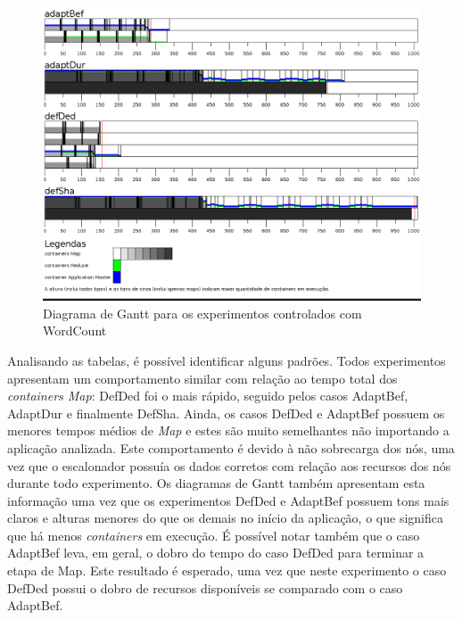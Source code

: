 \begin{figure}[!ht]
	\centering
	\includegraphics[width=\textwidth]{figuras/WC-simul.png}
	\caption{Diagrama de Gantt para os experimentos controlados com WordCount}
	\label{fig:exp1WC}
\end{figure}

Analisando as tabelas, é possível identificar alguns padrões. Todos experimentos apresentam um comportamento similar com relação ao tempo total dos \textit{containers Map}: DefDed foi o mais rápido, seguido pelos casos AdaptBef, AdaptDur e finalmente DefSha. Ainda, os casos DefDed e AdaptBef possuem os menores tempos médios de \textit{Map} e estes são muito semelhantes não importando a aplicação analizada. Este comportamento é devido à não sobrecarga dos nós, uma vez que o escalonador possuía os dados corretos com relação aos recursos dos nós durante todo experimento.
Os diagramas de Gantt também apresentam esta informação uma vez que os experimentos DefDed e AdaptBef possuem tons mais claros e alturas menores do que os demais no início da aplicação, o que significa que há menos \textit{containers} em execução. É possível notar também que o caso AdaptBef leva, em geral, o dobro do tempo do caso DefDed para terminar a etapa de Map. Este resultado é esperado, uma vez que neste experimento o caso DefDed possui o dobro de recursos disponíveis se comparado com o caso AdaptBef. 

